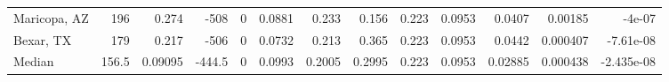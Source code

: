 \documentclass[12pt,letterpaper]{article}
\begin{document}
\begin{sidewaystable}
{\begin{tabular}{lrrrrrrrrrrrr}
 Maricopa, AZ       & 196   & 0.274   & -508   &     0 &          0.0881 &           0.233  &         0.156  &              0.223 &             0.0953 &           0.0407  &        0.00185  &       -4e-07     \\
 Bexar, TX          & 179   & 0.217   & -506   &     0 &          0.0732 &           0.213  &         0.365  &              0.223 &             0.0953 &           0.0442  &        0.000407 &       -7.61e-08  \\
\hline
 Median             & 156.5 & 0.09095 & -444.5 &     0 &          0.0993 &           0.2005 &         0.2995 &              0.223 &             0.0953 &           0.02885 &        0.000438 &       -2.435e-08 \\
\hline
\end{tabular}

}\end{sidewaystable}
\end{document}
